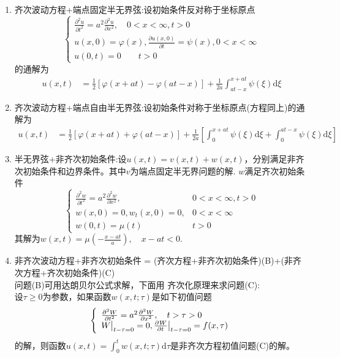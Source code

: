 \documentclass[UTF8,8pt]{ctexart}
\renewcommand{\r}[1]{{\color{red} #1}}
\begin{document}
\begin{multicols}{2}
\begin{enumerate}
    \item 齐次波动方程+端点固定半无界弦:设初始条件反对称于坐标原点$$ 
    \left\{\begin{array}{l}{\frac{\partial^{2} u}{\partial t^{2}}=a^{2} \frac{\partial^{2} u}{\partial x^{2}}, \quad 0<x<\infty, t>0} \\ {u(x, 0)=\varphi(x), \frac{\partial u(x, 0)}{\partial t}=\psi(x), 0<x<\infty} \\ {u(0, t)=0 \quad \quad t>0}\end{array}\right.
    $$
    的通解为$$ 
    \begin{aligned} u(x, t) &=\frac{1}{2}[\varphi(x+a t)-\varphi(a t-x)]+\frac{1}{2 a} \int_{a t-x}^{x+a t} \psi(\xi) \mathrm{d} \xi \end{aligned}
    $$
    \item 齐次波动方程+端点自由半无界弦:设初始条件对称于坐标原点(方程同上)的通解为
    $$ 
    \begin{aligned} u(x, t) &=\frac{1}{2}[\varphi(x+a t)+\varphi(a t-x)]+\frac{1}{2 a}\left[\int_{0}^{x+a t} \psi(\xi) \mathrm{d} \xi+\int_{0}^{a t-x} \psi(\xi) \mathrm{d} \xi\right] \end{aligned}
    $$
    \item 半无界弦+非齐次初始条件:设$u(x, t)=v(x, t)+w(x, t)$，分别满足非齐次初始条件和边界条件。其中$v$为端点固定半无界问题的解. $w$满足齐次初始条件
    $$\left\{\begin{array}{ll}
    {\frac{\partial^{2} w}{\partial t^{2}}=a^{2} \frac{\partial^{2} w}{\partial x^{2}},} & {0<x<\infty, t>0} \\ 
    {w(x, 0)=0, w_{t}(x, 0)=0,} & {0<x<\infty} \\ {w(0, t)=\mu(t)} & {t>0}
    \end{array}\right.$$
    其解为$w(x, t)=\mu\left(-\frac{x-a t}{a}\right), \quad x-a t<0$.
    \item 非齐次波动方程+非齐次初始条件 = (齐次方程+非齐次初始条件)(B)+(非齐次方程+齐次初始条件)(C)\\
    问题(B)可用达朗贝尔公式求解，下面用\r{齐次化原理}来求问题(C):\\
    设$\tau\geq0$为参数，如果函数$w(x,t;\tau)$是如下初值问题$$ 
    \left\{\begin{array}{l}
    \frac{\partial^{2} W}{\partial t^{2}}=a^{2} \frac{\partial^{2} W}{\partial x^{2}}, \quad t>\tau>0 \\ 
    W\big|_{t-\tau=0}=0, \frac{\partial^{} W}{\partial t^{}}\big|_{t-\tau=0}=f(x, \tau)
    \end{array}\right.
    $$的解，则函数$u(x, t)=\int_{0}^{t} w(x, t ; \tau) \mathrm{d} \tau$是非齐次方程初值问题(C)的解。\\

\end{enumerate}
\end{multicols}
\end{document}
